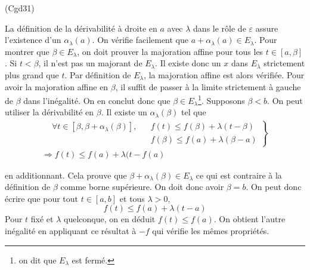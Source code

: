 \begin{tiny}(Cgd31)\end{tiny} La définition de la dérivabilité à droite en $a$ avec $\lambda$ dans le rôle de $\varepsilon$ assure l'existence d'un $\alpha_\lambda(a)$. On vérifie facilement que $a+\alpha_\lambda(a)\in E_\lambda$.\newline
Pour montrer que $\beta\in E_\lambda$, on doit prouver la majoration affine pour tous les $t\in [a,\beta]$.\newline
Si $t<\beta$, il n'est pas un majorant de $E_\lambda$. Il existe donc un $x$ dans $E_\lambda$ strictement plus grand que $t$. Par définition de $E_\lambda$, la majoration affine est alors vérifiée. 
Pour avoir la majoration affine en $\beta$, il suffit de passer à la limite strictement à gauche de $\beta$ dans l'inégalité. On en conclut donc que $\beta\in E_\lambda$\footnote{on dit que $E_\lambda$ est fermé.}.\newline
Supposons $\beta <b$. On peut utiliser la dérivabilité en $\beta$. Il existe un $\alpha_\lambda(\beta)$ tel que
\begin{multline*}
\left. 
\begin{aligned}
 &\forall t\in[\beta,\beta + \alpha_\lambda(\beta)],& & f(t)\leq f(\beta) + \lambda(t-\beta)\\
 & & & f(\beta)\leq f(a) + \lambda(\beta -a)
\end{aligned}
\right\rbrace \\
\Rightarrow
f(t)\leq f(a)+\lambda(t-f(a)
\end{multline*}

 en additionnant. Cela prouve que $\beta + \alpha_\lambda(\beta)\in E_\lambda$ ce qui est contraire à la définition de $\beta$ comme borne supérieure. On doit donc avoir $\beta=b$.\newline
On peut donc écrire que pour tout $t\in[a,b]$ et tous $\lambda >0$,
\begin{displaymath}
 f(t)\leq f(a) + \lambda(t-a)
\end{displaymath}
Pour $t$ fixé et $\lambda$ quelconque, on en déduit $f(t)\leq f(a)$. On obtient l'autre inégalité en appliquant ce résultat à $-f$ qui vérifie les mêmes propriétés.
